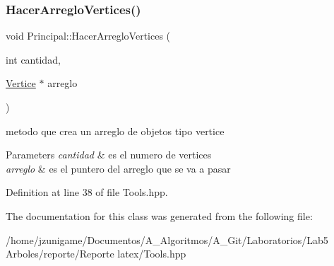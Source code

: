\subsubsection{\texorpdfstring{Hacer\+Arreglo\+Vertices()}{HacerArregloVertices()}}
{\footnotesize\ttfamily void Principal\+::\+Hacer\+Arreglo\+Vertices (\begin{DoxyParamCaption}\item[{int}]{cantidad,  }\item[{\hyperlink{class_vertice}{Vertice} $\ast$}]{arreglo }\end{DoxyParamCaption})\hspace{0.3cm}{\ttfamily [inline]}}



metodo que crea un arreglo de objetos tipo vertice 


\begin{DoxyParams}{Parameters}
{\em cantidad} & es el numero de vertices \\
\hline
{\em arreglo} & es el puntero del arreglo que se va a pasar \\
\hline
\end{DoxyParams}


Definition at line 38 of file Tools.\+hpp.



The documentation for this class was generated from the following file\+:\begin{DoxyCompactItemize}
\item 
/home/jzunigame/\+Documentos/\+A\+\_\+\+Algoritmos/\+A\+\_\+\+Git/\+Laboratorios/\+Lab5 Arboles/reporte/\+Reporte latex/Tools.\+hpp\end{DoxyCompactItemize}
